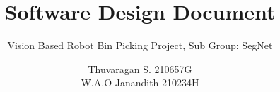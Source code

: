 \documentclass{template}
\begin{document}

\title{\huge{Software Design Document}}
\author{Thuvaragan S. 210657G \\ W.A.O Janandith 210234H}
\subtitle{Vision Based Robot Bin Picking Project, Sub Group: SegNet}
\beforeabstract
\tableofcontents
% 
\afterabstract








\footnotesize  %
\printbibliography
\normalsize
\appendix

\end{document}
